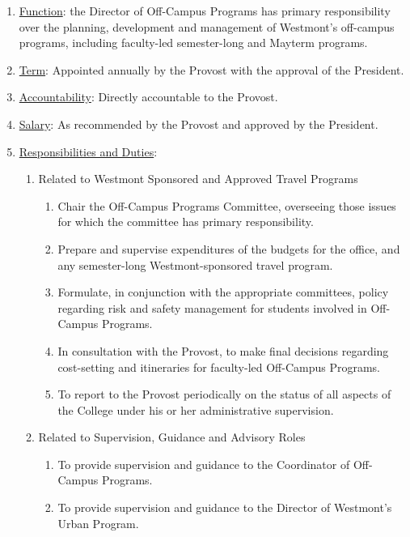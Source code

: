 \documentclass[letterpaper, 11pt]{article}
\newcounter{subsubparagraph}
\begin{document}
					\begin{enumerate}
						\item{\underline{Function}:  the Director of Off-Campus Programs has primary responsibility over the planning, development and management of Westmont's off-campus programs, including faculty-led semester-long and Mayterm programs.}
						\item{\underline{Term}:  Appointed annually by the Provost with the approval of the President.}
						\item{\underline{Accountability}:  Directly accountable to the Provost.}
						\item{\underline{Salary}:  As recommended by the Provost and approved by the President.}
						\item{\underline{Responsibilities and Duties}:
							\begin{enumerate}
								\item{Related to Westmont Sponsored and Approved Travel Programs
									\begin{enumerate}
										\item{Chair the Off-Campus Programs Committee, overseeing those issues for which the committee has primary responsibility.}
										\item{Prepare and supervise expenditures of the budgets for the office, and any semester-long Westmont-sponsored travel program.}
										\item{Formulate, in conjunction with the appropriate committees, policy regarding risk and safety management for students involved in Off-Campus Programs.}
										\item{In consultation with the Provost, to make final decisions regarding cost-setting and itineraries for faculty-led Off-Campus Programs.}
										\item{To report to the Provost periodically on the status of all aspects of the College under his or her administrative supervision.}
									\end{enumerate}
								}
								\item{ Related to Supervision, Guidance and Advisory Roles
									\begin{enumerate}
										\item{To provide supervision and guidance to the Coordinator of Off-Campus Programs.}
										\item{To provide supervision and guidance to the Director of Westmont's Urban Program.}
									\end{enumerate}
								}
							\end{enumerate}
						}
					\end{enumerate}
\end{document}

